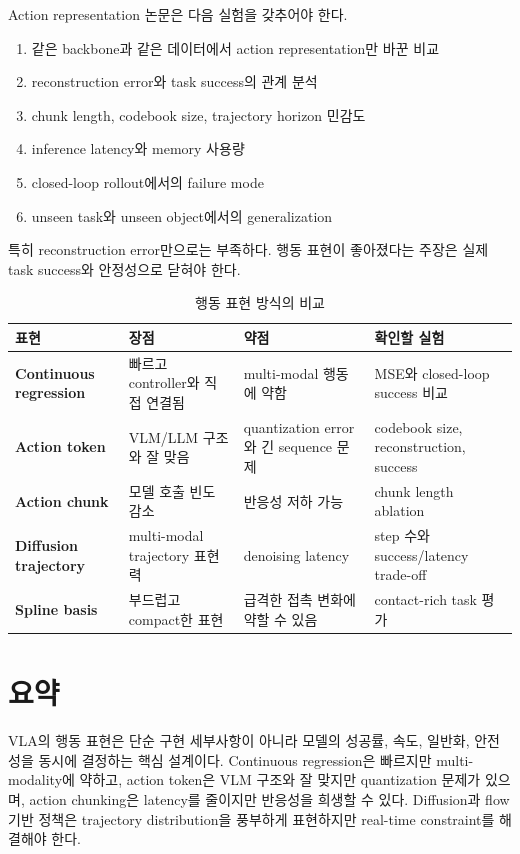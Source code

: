 Action representation 논문은 다음 실험을 갖추어야 한다.

\begin{enumerate}
  \item 같은 backbone과 같은 데이터에서 action representation만 바꾼 비교
  \item reconstruction error와 task success의 관계 분석
  \item chunk length, codebook size, trajectory horizon 민감도
  \item inference latency와 memory 사용량
  \item closed-loop rollout에서의 failure mode
  \item unseen task와 unseen object에서의 generalization
\end{enumerate}

특히 reconstruction error만으로는 부족하다. 행동 표현이 좋아졌다는 주장은 실제 task success와 안정성으로 닫혀야 한다.

\begin{table}[t]
  \centering
  \caption{행동 표현 방식의 비교}
  \label{tab:action_rep_comparison}
  \begin{tabularx}{\textwidth}{>{\bfseries}p{30mm}XXX}
    \toprule
    표현 & 장점 & 약점 & 확인할 실험 \\
    \midrule
    Continuous regression & 빠르고 controller와 직접 연결됨 & multi-modal 행동에 약함 & MSE와 closed-loop success 비교 \\
    Action token & VLM/LLM 구조와 잘 맞음 & quantization error와 긴 sequence 문제 & codebook size, reconstruction, success \\
    Action chunk & 모델 호출 빈도 감소 & 반응성 저하 가능 & chunk length ablation \\
    Diffusion trajectory & multi-modal trajectory 표현력 & denoising latency & step 수와 success/latency trade-off \\
    Spline basis & 부드럽고 compact한 표현 & 급격한 접촉 변화에 약할 수 있음 & contact-rich task 평가 \\
    \bottomrule
  \end{tabularx}
\end{table}

\section{요약}

VLA의 행동 표현은 단순 구현 세부사항이 아니라 모델의 성공률, 속도, 일반화, 안전성을 동시에 결정하는 핵심 설계이다. Continuous regression은 빠르지만 multi-modality에 약하고, action token은 VLM 구조와 잘 맞지만 quantization 문제가 있으며, action chunking은 latency를 줄이지만 반응성을 희생할 수 있다. Diffusion과 flow 기반 정책은 trajectory distribution을 풍부하게 표현하지만 real-time constraint를 해결해야 한다.

